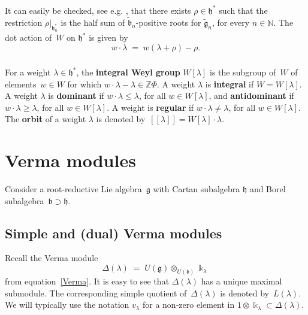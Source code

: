 \documentclass[11pt]{amsart}
\newcommand{\rR}{\Phi}
\newcommand{\mk}{\Bbbk}
\newcommand{\fg}{\mathfrak{g}}
\newcommand{\fl}{\mathfrak{l}}
\newcommand{\fh}{\mathfrak{h}}
\newcommand{\fb}{\mathfrak{b}}
\newcommand{\mN}{\mathbb{N}}
\newcommand{\mZ}{\mathbb{Z}}
\numberwithin{equation}{section}
\theoremstyle{plain}
\theoremstyle{remark}
\theoremstyle{remark}
\theoremstyle{construction}
\begin{document}
\subsubsection{}\label{rhoshift}It can easily be checked, see e.g. \cite[Corollary~1.8]{Nam}, that there exists $\rho\in\fh^\ast$ such that the restriction $\rho|_{\fh_n^\ast}$ is the half sum of $\widetilde{\fb}_n$-positive roots for $\widetilde{\fg}_n$, for every $n\in\mN$. The dot action of~$W$ on $\fh^\ast$ is given by
$$w\cdot\lambda\;=\;w(\lambda+\rho)-\rho.$$

\subsubsection{} For a weight $\lambda\in\fh^\ast$, the {\bf integral Weyl group} $W[\lambda]$ is the subgroup of~$W$ of elements~$w\in W$ for which $w\cdot\lambda-\lambda\in\mZ\rR$. A weight $\lambda$ is {\bf integral} if $W=W[\lambda]$.
A weight $\lambda$ is {\bf dominant} if $w\cdot\lambda\le \lambda$, for all $w\in W[\lambda]$, and {\bf antidominant} if $w\cdot\lambda\ge \lambda$, for all $w\in W[\lambda]$. A weight is {\bf regular} if $w\cdot\lambda\not=\lambda$, for all $w\in W[\lambda]$.
The {\bf orbit} of a weight $\lambda$ is denoted by~$[\![\lambda]\!]=W[\lambda]\cdot\lambda$. 





\section{Verma modules}
Consider a root-reductive Lie algebra~$\fg$ with Cartan subalgebra $\fh$ and Borel subalgebra~$\fb\supset\fh$.

\subsection{Simple and (dual) Verma modules}

Recall the {Verma module}
$$\Delta(\lambda)\;=\;U(\fg)\otimes_{U(\fb)}\mk_\lambda$$ 
from equation~\eqref{Verma}. It is easy to see that {$\Delta(\lambda)$} has a unique maximal submodule. The corresponding simple quotient of~$\Delta(\lambda)$ is denoted by~$L(\lambda)$. 
We will typically use the notation $v_\lambda$ for a non-zero element in $1\otimes \mk_\lambda\subset\Delta(\lambda)$.
\end{document}
